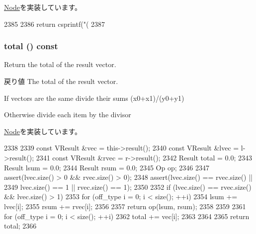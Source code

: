 \hyperlink{classStats_1_1Node_a6522bc65bd97a6b1ef6cdfe78462a919}{Node}を実装しています。


\begin{DoxyCode}
2385     {
2386         return csprintf("(%
2387     }
\end{DoxyCode}
\hypertarget{classStats_1_1BinaryNode_a35c6e2ed3fc81b40d69052a062113ead}{
\subsubsection[{total}]{ total () const}}
\label{classStats_1_1BinaryNode_a35c6e2ed3fc81b40d69052a062113ead}
Return the total of the result vector. \begin{DoxyReturn}{戻り値}
The total of the result vector. 
\end{DoxyReturn}


If vectors are the same divide their sums (x0+x1)/(y0+y1)

Otherwise divide each item by the divisor 

\hyperlink{classStats_1_1Node_ab152b7e89b37a7db03b04d500ceb8349}{Node}を実装しています。


\begin{DoxyCode}
2338     {
2339         const VResult &vec = this->result();
2340         const VResult &lvec = l->result();
2341         const VResult &rvec = r->result();
2342         Result total = 0.0;
2343         Result lsum = 0.0;
2344         Result rsum = 0.0;
2345         Op op;
2346 
2347         assert(lvec.size() > 0 && rvec.size() > 0);
2348         assert(lvec.size() == rvec.size() ||
2349                lvec.size() == 1 || rvec.size() == 1);
2350 
2352         if (lvec.size() == rvec.size() && lvec.size() > 1) {
2353             for (off_type i = 0; i < size(); ++i) {
2354                 lsum += lvec[i];
2355                 rsum += rvec[i];
2356             }
2357             return op(lsum, rsum);
2358         }
2359 
2361         for (off_type i = 0; i < size(); ++i) {
2362             total += vec[i];
2363         }
2364 
2365         return total;
2366     }
\end{DoxyCode}


